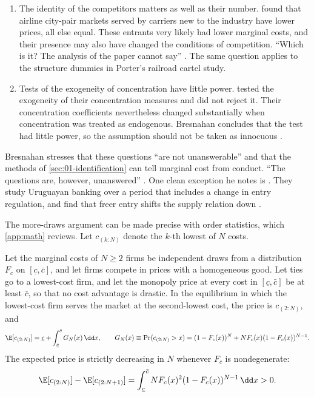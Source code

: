 \begin{enumerate}[label=(\roman*)]
less concentrated markets can reflect a lower $\overline{mc}$, a lower $\theta$, or both. Most authors
have the second in mind. The two can also be linked, because a firm with a large cost advantage may
behave less competitively than it would against equal rivals.
\item The identity of the competitors matters as well as their number. \citet{GrahamKaplanSibley1983}
found that
airline city-pair markets served by carriers new to the industry have lower prices, all else equal.
These entrants very likely had
lower marginal costs, and their presence may also have changed the conditions of competition. ``Which is
it? The analysis of the paper cannot say'' \citep[p.~1044]{Bresnahan1989}. The same question applies to
the structure dummies in Porter's \citeyearpar{Porter1983} railroad cartel study.
\item Tests of the exogeneity of concentration have little power. \citet{GrahamKaplanSibley1983} tested the
exogeneity of their concentration measures and did not reject it. Their concentration coefficients
nevertheless changed
substantially when concentration was treated as endogenous. Bresnahan concludes that the test had little
power, so the assumption should not be taken as innocuous \citep[p.~1043, fn.~35]{Bresnahan1989}.
\end{enumerate}
Bresnahan stresses that these questions ``are not unanswerable'' and that the methods of
\cref{sec:01-identification} can tell marginal cost from conduct. ``The questions are, however,
unanswered'' \citep[p.~1044]{Bresnahan1989}. One clean exception he notes is \citet{SpillerFavaro1984}.
They study Uruguayan banking over a period that includes a change in entry regulation, and find that
freer entry shifts the supply relation down \citep[p.~1044, fn.~36]{Bresnahan1989}.

The more-draws argument can be made precise with order statistics, which \cref{app:math} reviews. Let
$c_{(k:N)}$ denote the $k$-th lowest of $N$ costs.

\begin{proposition}\label{prop:01-more-draws}
Let the marginal costs of $N \ge 2$ firms be independent draws from a distribution $F_c$ on $[\underline
c, \bar c]$, and let firms compete in prices with a homogeneous good. Let ties go to a lowest-cost firm, and
let the monopoly price at every cost in $[\underline c, \bar c]$ be at least $\bar c$, so that no cost advantage
is drastic. In the equilibrium in which the lowest-cost firm serves the market at the second-lowest cost, the
price is $c_{(2:N)}$, and
\[
\E[c_{(2:N)}] = \underline c + \int_{\underline c}^{\bar c} G_N(x) \, \dd x, \qquad
G_N(x) \equiv \Pr(c_{(2:N)} > x) = (1 - F_c(x))^N + N F_c(x) (1 - F_c(x))^{N - 1}.
\]
The expected price is strictly decreasing in $N$ whenever $F_c$ is nondegenerate:
\[
\E[c_{(2:N)}] - \E[c_{(2:N+1)}] = \int_{\underline c}^{\bar c} N F_c(x)^2 (1 - F_c(x))^{N - 1} \, \dd x
> 0 .
\]
\end{proposition}

